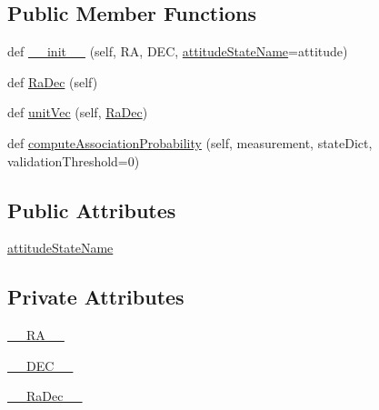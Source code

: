 \subsection*{Public Member Functions}
\begin{DoxyCompactItemize}
\item 
def \hyperlink{classmodest_1_1signals_1_1PointSource_1_1__PointSource_a4152c0563858a1e8c2d84c9e0d807f8a}{\+\_\+\+\_\+init\+\_\+\+\_\+} (self, RA, D\+EC, \hyperlink{classmodest_1_1signals_1_1PointSource_1_1__PointSource_ae61b56a5682a25a943a9e1ea2108bf4c}{attitude\+State\+Name}=\textquotesingle{}attitude\textquotesingle{})
\item 
def \hyperlink{classmodest_1_1signals_1_1PointSource_1_1__PointSource_aa70fa3c0694ca213d98e18db5462b2a5}{Ra\+Dec} (self)
\item 
def \hyperlink{classmodest_1_1signals_1_1PointSource_1_1__PointSource_a0d7ded15cd44aa68ca82466f31e0693e}{unit\+Vec} (self, \hyperlink{classmodest_1_1signals_1_1PointSource_1_1__PointSource_aa70fa3c0694ca213d98e18db5462b2a5}{Ra\+Dec})
\item 
def \hyperlink{classmodest_1_1signals_1_1PointSource_1_1__PointSource_a83260238d115219d44e1950af323f239}{compute\+Association\+Probability} (self, measurement, state\+Dict, validation\+Threshold=0)
\end{DoxyCompactItemize}
\subsection*{Public Attributes}
\begin{DoxyCompactItemize}
\item 
\hyperlink{classmodest_1_1signals_1_1PointSource_1_1__PointSource_ae61b56a5682a25a943a9e1ea2108bf4c}{attitude\+State\+Name}
\end{DoxyCompactItemize}
\subsection*{Private Attributes}
\begin{DoxyCompactItemize}
\item 
\hyperlink{classmodest_1_1signals_1_1PointSource_1_1__PointSource_a0da77e41ae1beb2693c8af264ce2e47a}{\+\_\+\+\_\+\+R\+A\+\_\+\+\_\+}
\item 
\hyperlink{classmodest_1_1signals_1_1PointSource_1_1__PointSource_a0504d1af7508a60003f0b8751a0b1fca}{\+\_\+\+\_\+\+D\+E\+C\+\_\+\+\_\+}
\item 
\hyperlink{classmodest_1_1signals_1_1PointSource_1_1__PointSource_a91e88bd47be277788194ad890facbdbd}{\+\_\+\+\_\+\+Ra\+Dec\+\_\+\+\_\+}
\end{DoxyCompactItemize}


